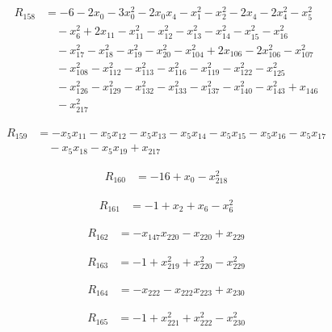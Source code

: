 \begin{align*}
R_{158} &= -6 -2 x_{0} -3 x_{0}^{2} -2 x_{0} x_{4} -x_{1}^{2} -x_{2}^{2} -2 x_{4} -2 x_{4}^{2} -x_{5}^{2} \\
&\quad -x_{6}^{2} +2 x_{11} -x_{11}^{2} -x_{12}^{2} -x_{13}^{2} -x_{14}^{2} -x_{15}^{2} -x_{16}^{2} \\
&\quad -x_{17}^{2} -x_{18}^{2} -x_{19}^{2} -x_{20}^{2} -x_{104}^{2} +2 x_{106} -2 x_{106}^{2} -x_{107}^{2} \\
&\quad -x_{108}^{2} -x_{112}^{2} -x_{113}^{2} -x_{116}^{2} -x_{119}^{2} -x_{122}^{2} -x_{125}^{2} \\
&\quad -x_{126}^{2} -x_{129}^{2} -x_{132}^{2} -x_{133}^{2} -x_{137}^{2} -x_{140}^{2} -x_{143}^{2} +x_{146} \\
&\quad -x_{217}^{2}
\end{align*}

\begin{align*}
R_{159} &= -x_{5} x_{11} -x_{5} x_{12} -x_{5} x_{13} -x_{5} x_{14} -x_{5} x_{15} -x_{5} x_{16} -x_{5} x_{17} \\
&\quad -x_{5} x_{18} -x_{5} x_{19} +x_{217}
\end{align*}

\begin{align*}
R_{160} &= -16 +x_{0} -x_{218}^{2}
\end{align*}

\begin{align*}
R_{161} &= -1 +x_{2} +x_{6} -x_{6}^{2}
\end{align*}

\begin{align*}
R_{162} &= -x_{147} x_{220} -x_{220} +x_{229}
\end{align*}

\begin{align*}
R_{163} &= -1 +x_{219}^{2} +x_{220}^{2} -x_{229}^{2}
\end{align*}

\begin{align*}
R_{164} &= -x_{222} -x_{222} x_{223} +x_{230}
\end{align*}

\begin{align*}
R_{165} &= -1 +x_{221}^{2} +x_{222}^{2} -x_{230}^{2}
\end{align*}

